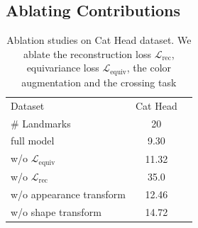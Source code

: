 

	\subsection{Ablating Contributions}\label{sec:ablation}
			\begin{table}
				\centering
				\begin{tabular}{l|cr}
					\hline
					Dataset & Cat Head    \\
					\# Landmarks &  20 \\ \hline
					full model &  9.30 \\ \hline
					w/o $\mathcal{L}_{\textrm{equiv}}$   & 11.32 \\
					w/o $\mathcal{L}_{\textrm{rec}}$   & 35.0 \\
					w/o appearance transform & 12.46 \\
					w/o shape transform & 14.72 \\ \hline
				\end{tabular}
				\caption{{Ablation studies on Cat Head dataset. We ablate the reconstruction loss $\mathcal{L}_{\textrm{rec}}$, equivariance loss $\mathcal{L}_{\textrm{equiv}}$, the color augmentation and the crossing task}}
				\label{tab:ablation}
			\end{table}

